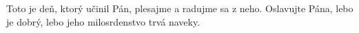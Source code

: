 Toto je deň, ktorý učinil Pán,
plesajme a radujme sa z neho.
\versseparator
Oslavujte Pána, lebo je dobrý,
lebo jeho milosrdenstvo trvá naveky.
